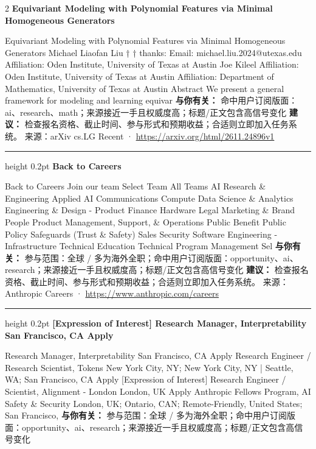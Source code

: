\documentclass[10.5pt]{ctexart}
\begin{document}
\begin{multicols}{2}
{\large\bfseries Equivariant Modeling with Polynomial Features via Minimal Homogeneous Generators}\par
Equivariant Modeling with Polynomial Features via Minimal Homogeneous Generators Michael Liaofan Liu † † thanks: Email: michael.liu.2024@utexas.edu Affiliation: Oden Institute, University of Texas at Austin Joe Kileel Affiliation: Oden Institute, University of Texas at Austin Affiliation: Department of Mathematics, University of Texas at Austin Abstract We present a general framework for modeling and learning equivar
\textbf{与你有关：} 命中用户订阅版面：ai、research、math；来源接近一手且权威度高；标题/正文包含高信号变化
\textbf{建议：} 检查报名资格、截止时间、参与形式和预期收益；合适则立即加入任务系统。
{\footnotesize\color{ormuted} 来源：arXiv cs.LG Recent · \url{https://arxiv.org/html/2611.24896v1}}
\vspace{2mm}
\hrule height 0.2pt
\vspace{2mm}
{\large\bfseries Back to Careers}\par
Back to Careers Join our team Select Team All Teams AI Research \& Engineering Applied AI Communications Compute Data Science \& Analytics Engineering \& Design - Product Finance Hardware Legal Marketing \& Brand People Product Management, Support, \& Operations Public Benefit Public Policy Safeguards (Trust \& Safety) Sales Security Software Engineering - Infrastructure Technical Education Technical Program Management Sel
\textbf{与你有关：} 参与范围：全球 / 多为海外全职；命中用户订阅版面：opportunity、ai、research；来源接近一手且权威度高；标题/正文包含高信号变化
\textbf{建议：} 检查报名资格、截止时间、参与形式和预期收益；合适则立即加入任务系统。
{\footnotesize\color{ormuted} 来源：Anthropic Careers · \url{https://www.anthropic.com/careers}}
\vspace{2mm}
\hrule height 0.2pt
\vspace{2mm}
{\large\bfseries [Expression of Interest] Research Manager, Interpretability San Francisco, CA Apply}\par
[Expression of Interest] Research Manager, Interpretability San Francisco, CA Apply Research Engineer / Research Scientist, Tokens New York City, NY; New York City, NY | Seattle, WA; San Francisco, CA Apply [Expression of Interest] Research Engineer / Scientist, Alignment - London London, UK Apply Anthropic Fellows Program, AI Safety \& Security London, UK; Ontario, CAN; Remote-Friendly, United States; San Francisco, 
\textbf{与你有关：} 参与范围：全球 / 多为海外全职；命中用户订阅版面：opportunity、ai、research；来源接近一手且权威度高；标题/正文包含高信号变化

\end{multicols}
\end{document}
